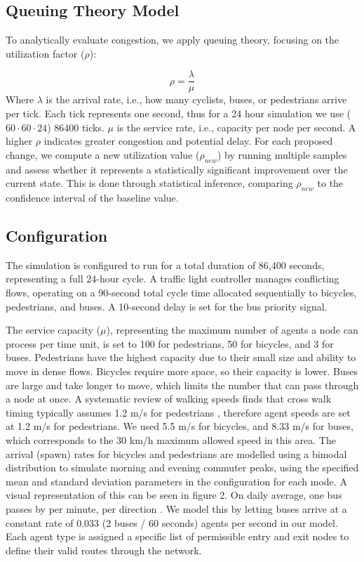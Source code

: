 \documentclass[letterpaper, 10 pt, conference]{ieeeconf}
\begin{document}
\subsection{Queuing Theory Model}
To analytically evaluate congestion, we apply queuing theory, focusing on the
utilization factor ($\rho$):

$$
    \rho = \frac{\lambda}{\mu}
$$
Where $\lambda$ is the arrival rate, i.e., how many cyclists, buses, or pedestrians arrive per tick. Each tick represents one second, thus for a 24 hour simulation we use ($60 \cdot 60 \cdot 24$) 86400 ticks. $\mu$ is the service rate, i.e., capacity per node per second. A higher $\rho$ indicates greater congestion and potential delay. For each proposed change, we compute a new utilization value ($\rho_{new}$) by running multiple samples and assess whether it represents a statistically significant improvement over the current state. This is done through statistical inference, comparing $\rho_{new}$ to the confidence interval of the baseline value.

\subsection{Configuration}
The simulation is configured to run for a total duration of 86,400 seconds, representing a full 24-hour cycle. A traffic light controller manages conflicting flows, operating on a 90-second total cycle time allocated sequentially to bicycles, pedestrians, and buses. A 10-second delay is set for the bus priority signal. 

The service capacity ($\mu$), representing the maximum number of agents a node can process per time unit, is set to 100 for pedestrians, 50 for bicycles, and 3 for buses. Pedestrians have the highest capacity due to their small size and ability to move in dense flows. Bicycles require more space, so their capacity is lower. Buses are large and take longer to move, which limits the number that can pass through a node at once. A systematic review of walking speeds finds that cross walk timing typically assumes 1.2 m/s for pedestrians \parencite{su16114813}, therefore agent speeds are set at 1.2 m/s for pedestrians.
We used 5.5 m/s for bicycles, and 8.33 m/s for buses, which corresponds to the 30 km/h maximum allowed speed in this area. The arrival (spawn) rates for bicycles and pedestrians are modelled using a bimodal distribution \parencite{park-2024} to simulate morning and evening commuter peaks, using the specified mean and standard deviation parameters in the configuration for each mode. A visual representation of this can be seen in figure 2. On daily average, one bus passes by per minute, per direction \parencite{studiobereikbaar2024}. We model this by letting buses arrive at a constant rate of 0.033 (2 buses / 60 seconds) agents per second in our model. Each agent type is assigned a specific list of permissible entry and exit nodes to define their valid routes through the network.
\end{document}
